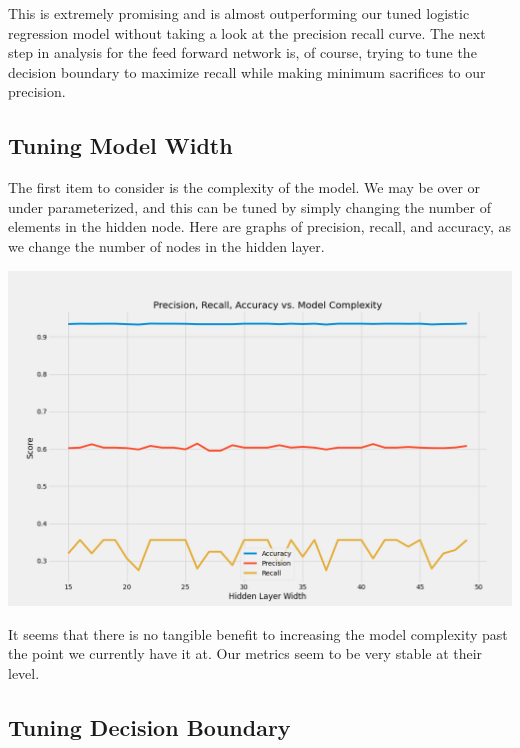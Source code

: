 \documentclass[12pt]{article}
\begin{document}
	This is extremely promising and is almost outperforming our tuned logistic regression model without taking a look at the precision recall curve. The next step in analysis for the feed forward network is, of course, trying to tune the decision boundary to maximize recall while making minimum sacrifices to our precision. 
	
	\subsection{Tuning Model Width}
	
	
	The first item to consider is the complexity of the model. We may be over or under parameterized, and this can be tuned by simply changing the number of elements in the hidden node. Here are graphs of precision, recall, and accuracy, as we change the number of nodes in the hidden layer. 
	
	
	\includegraphics[scale=0.4]{../notebooks/nn_width.png}
	
	It seems that there is no tangible benefit to increasing the model complexity past the point we currently have it at. Our metrics seem to be very stable at their level. 
	
	
	\subsection{Tuning Decision Boundary }
	
\end{document}
